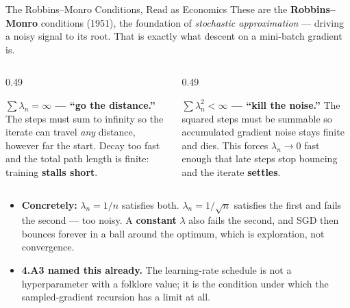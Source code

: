 \begin{frame}{The Robbins--Monro Conditions, Read as Economics}
\small
These are the \textbf{Robbins--Monro} conditions (1951), the foundation of \emph{stochastic approximation} --- driving a noisy signal to its root. That is exactly what descent on a mini-batch gradient is.
\vspace{-1mm}
\begin{columns}[T]
\begin{column}{0.49\textwidth}
\begin{conceptbox}\small
\textbf{$\sum\lambda_n=\infty$ --- ``go the distance.''}
The steps must sum to infinity so the iterate can travel \emph{any} distance, however far the start. Decay too fast and the total path length is finite: training \textbf{stalls short}.
\end{conceptbox}
\end{column}
\begin{column}{0.49\textwidth}
\begin{conceptbox}\small
\textbf{$\sum\lambda_n^{2}<\infty$ --- ``kill the noise.''}
The squared steps must be summable so accumulated gradient noise stays finite and dies. This forces $\lambda_n\to0$ fast enough that late steps stop bouncing and the iterate \textbf{settles}.
\end{conceptbox}
\end{column}
\end{columns}
\medskip
\begin{itemize}\small\setlength{\itemsep}{1mm}
  \item \textbf{Concretely:} $\lambda_n=1/n$ satisfies both. $\lambda_n=1/\sqrt n$ satisfies the first and fails the second --- too noisy. A \textbf{constant} $\lambda$ also fails the second, and SGD then bounces forever in a ball around the optimum, which is exploration, not convergence.
  \item \textbf{4.A3 named this already.} The learning-rate schedule is not a hyperparameter with a folklore value; it is the condition under which the sampled-gradient recursion has a limit at all.
\end{itemize}
\vspace{1mm}
\end{frame}

